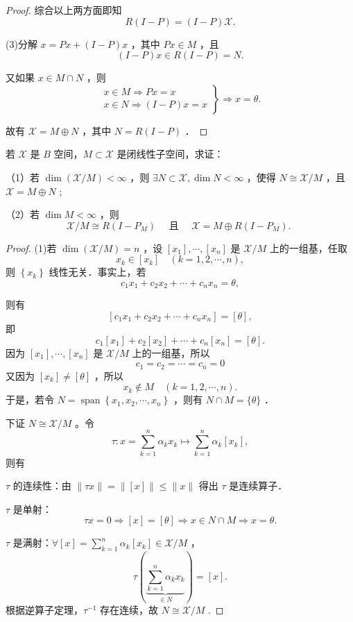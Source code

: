 \documentclass[lang=cn,newtx,10pt,scheme=chinese,thmcnt=chapter]{elegantbook}
\begin{document}
\begin{problemset}
\begin{proof}
综合以上两方面即知
$$
R(I-P)=(I-P) \mathcal{X} .
$$

(3)分解 $x=P x+(I-P) x$ ，其中 $P x \in M$ ，且
$$
(I-P) x \in R(I-P)=N .
$$

又如果 $x \in M \cap N$ ，则
$$
\left.\begin{array}{r}
x \in M \Rightarrow P x=x \\
x \in N \Longrightarrow(I-P) x=x
\end{array}\right\} \Rightarrow x=\theta .
$$

故有 $\mathcal{X}=M \oplus N$ ，其中 $N=R(I-P)$ ．
\end{proof}
\item  若 $\mathcal{X}$ 是 $B$ 空间，$M \subset \mathcal{X}$ 是闭线性子空间，求证：

（1）若 $\operatorname{dim}(\mathcal{X} / M)<\infty$ ，则 $\exists N \subset \mathcal{X}, \operatorname{dim} N<\infty$ ，使得 $N \cong \mathcal{X} / M$ ，且 $\mathcal{X}=M \oplus N$ ;

（2）若 $\operatorname{dim} M<\infty$ ，则
$$
\mathcal{X} / M \cong R\left(I-P_M\right) \quad \text { 且 } \quad \mathcal{X}=M \oplus R\left(I-P_M\right) \text {. }
$$

\begin{proof}
(1)若 $\operatorname{dim}(\mathcal{X} / M)=n$ ，设 $\left[x_1\right], \cdots,\left[x_n\right]$ 是 $\mathcal{X} / M$ 上的一组基，任取
$$
x_k \in\left[x_k\right] \quad(k=1,2, \cdots, n),
$$
则 $\left\{x_k\right\}$ 线性无关．事实上，若
$$
c_1 x_1+c_2 x_2+\cdots+c_n x_n=\theta,
$$

则有
$$
\left[c_1 x_1+c_2 x_2+\cdots+c_n x_n\right]=[\theta],
$$
即
$$
c_1\left[x_1\right]+c_2\left[x_2\right]+\cdots+c_n\left[x_n\right]=[\theta] .
$$
因为 $\left[x_1\right], \cdots,\left[x_n\right]$ 是 $\mathcal{X} / M$ 上的一组基，所以$$
c_1=c_2=\cdots=c_n=0
$$
又因为 $\left[x_k\right] \neq[\theta]$ ，所以
$$
x_k \notin M \quad(k=1,2, \cdots, n) .
$$
于是，若令 $N=\operatorname{span}\left\{x_1, x_2, \cdots, x_n\right\}$ ，则有 $N \cap M=\{\theta\}$ ．

下证 $N \cong \mathcal{X} / M$ 。令
$$
\tau: x=\sum_{k=1}^n \alpha_k x_k \mapsto \sum_{k=1}^n \alpha_k\left[x_k\right],
$$
则有

$\tau$ 的连续性：由 $\|\tau x\|=\|[x]\| \leqslant\|x\|$ 得出 $\tau$ 是连续算子．

$\tau$ 是单射：
$$
\tau x=0 \Longrightarrow[x]=[\theta] \Longrightarrow x \in N \cap M \Longrightarrow x=\theta .
$$

$\tau$ 是满射：$\forall[x]=\sum_{k=1}^n \alpha_k\left[x_k\right] \in \mathcal{X} / M$ ，
$$
\tau(\underbrace{\sum_{k=1}^n \alpha_k x_k}_{\in N})=[x] .
$$
根据逆算子定理，$\tau^{-1}$ 存在连续，故 $N \cong \mathcal{X} / M$ .


\end{proof}
\end{problemset}
\end{document}
